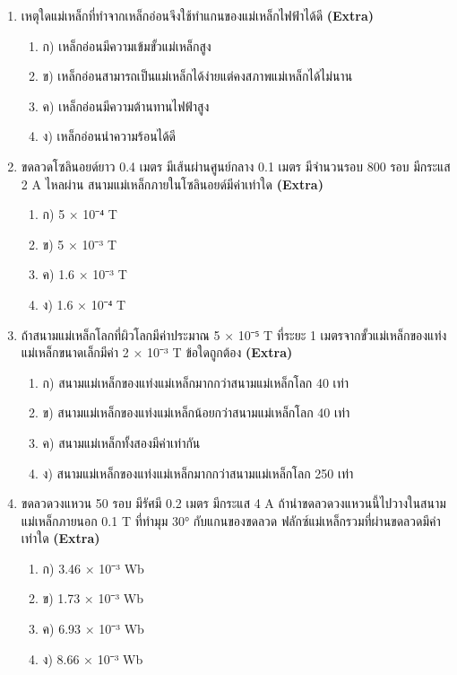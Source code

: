 \documentclass[12pt]{article}
\begin{document}
\begin{enumerate}[label=\arabic*.]
\begin{enumerate}[label=)]
\item ก) เพิ่มเป็น 2 เท่า
\item ข) เพิ่มเป็น 4 เท่า
\item ค) เพิ่มเป็น 8 เท่า
\item ง) เพิ่มเป็น 16 เท่า
\end{enumerate}
\item เหตุใดแม่เหล็กที่ทำจากเหล็กอ่อนจึงใช้ทำแกนของแม่เหล็กไฟฟ้าได้ดี \hfill \textbf{\small (Extra)}
\begin{enumerate}[label=)]
\item ก) เหล็กอ่อนมีความเข้มขั้วแม่เหล็กสูง
\item ข) เหล็กอ่อนสามารถเป็นแม่เหล็กได้ง่ายแต่คงสภาพแม่เหล็กได้ไม่นาน
\item ค) เหล็กอ่อนมีความต้านทานไฟฟ้าสูง
\item ง) เหล็กอ่อนนำความร้อนได้ดี
\end{enumerate}
\item ขดลวดโซลินอยด์ยาว 0.4 เมตร มีเส้นผ่านศูนย์กลาง 0.1 เมตร มีจำนวนรอบ 800 รอบ มีกระแส 2 A ไหลผ่าน สนามแม่เหล็กภายในโซลินอยด์มีค่าเท่าใด \hfill \textbf{\small (Extra)}
\begin{enumerate}[label=)]
\item ก) 5 × 10⁻⁴ T
\item ข) 5 × 10⁻³ T
\item ค) 1.6 × 10⁻³ T
\item ง) 1.6 × 10⁻⁴ T
\end{enumerate}
\item ถ้าสนามแม่เหล็กโลกที่ผิวโลกมีค่าประมาณ 5 × 10⁻⁵ T ที่ระยะ 1 เมตรจากขั้วแม่เหล็กของแท่งแม่เหล็กขนาดเล็กมีค่า 2 × 10⁻³ T ข้อใดถูกต้อง \hfill \textbf{\small (Extra)}
\begin{enumerate}[label=)]
\item ก) สนามแม่เหล็กของแท่งแม่เหล็กมากกว่าสนามแม่เหล็กโลก 40 เท่า
\item ข) สนามแม่เหล็กของแท่งแม่เหล็กน้อยกว่าสนามแม่เหล็กโลก 40 เท่า
\item ค) สนามแม่เหล็กทั้งสองมีค่าเท่ากัน
\item ง) สนามแม่เหล็กของแท่งแม่เหล็กมากกว่าสนามแม่เหล็กโลก 250 เท่า
\end{enumerate}
\item ขดลวดวงแหวน 50 รอบ มีรัศมี 0.2 เมตร มีกระแส 4 A ถ้านำขดลวดวงแหวนนี้ไปวางในสนามแม่เหล็กภายนอก 0.1 T ที่ทำมุม 30° กับแกนของขดลวด ฟลักซ์แม่เหล็กรวมที่ผ่านขดลวดมีค่าเท่าใด \hfill \textbf{\small (Extra)}
\begin{enumerate}[label=)]
\item ก) 3.46 × 10⁻³ Wb
\item ข) 1.73 × 10⁻³ Wb
\item ค) 6.93 × 10⁻³ Wb
\item ง) 8.66 × 10⁻³ Wb
\end{enumerate}
\end{enumerate}
\end{document}
